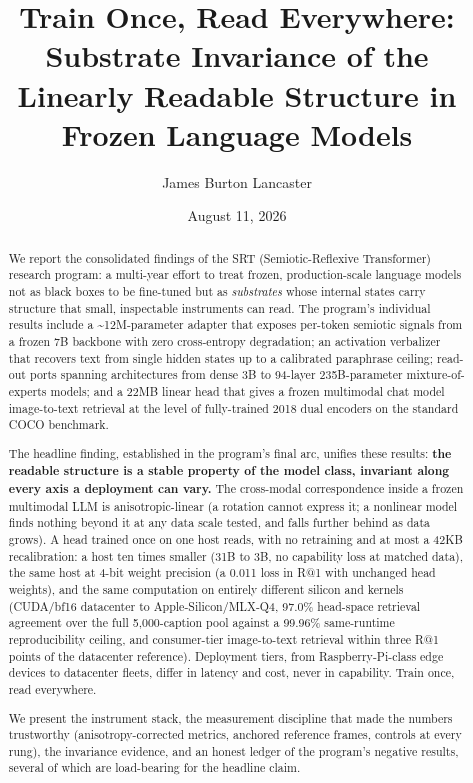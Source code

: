 \documentclass[
  11pt,
]{article}
\title{Train Once, Read Everywhere: Substrate Invariance of the Linearly
Readable Structure in Frozen Language Models}
\author{James Burton Lancaster}
\date{August 11, 2026}
\begin{document}
\maketitle
\begin{abstract}
We report the consolidated findings of the SRT (Semiotic-Reflexive
Transformer) research program: a multi-year effort to treat frozen,
production-scale language models not as black boxes to be fine-tuned but
as \emph{substrates} whose internal states carry structure that small,
inspectable instruments can read. The program's individual results
include a \textasciitilde12M-parameter adapter that exposes per-token
semiotic signals from a frozen 7B backbone with zero cross-entropy
degradation; an activation verbalizer that recovers text from single
hidden states up to a calibrated paraphrase ceiling; read-out ports
spanning architectures from dense 3B to 94-layer 235B-parameter
mixture-of-experts models; and a 22MB linear head that gives a frozen
multimodal chat model image-to-text retrieval at the level of
fully-trained 2018 dual encoders on the standard COCO benchmark.

The headline finding, established in the program's final arc, unifies
these results: \textbf{the readable structure is a stable property of
the model class, invariant along every axis a deployment can vary.} The
cross-modal correspondence inside a frozen multimodal LLM is
anisotropic-linear (a rotation cannot express it; a nonlinear model
finds nothing beyond it at any data scale tested, and falls further
behind as data grows). A head trained once on one host reads, with no
retraining and at most a 42KB recalibration: a host ten times smaller
(31B to 3B, no capability loss at matched data), the same host at 4-bit
weight precision (a 0.011 loss in R@1 with unchanged head weights), and
the same computation on entirely different silicon and kernels
(CUDA/bf16 datacenter to Apple-Silicon/MLX-Q4, 97.0\% head-space
retrieval agreement over the full 5,000-caption pool against a 99.96\%
same-runtime reproducibility ceiling, and consumer-tier image-to-text
retrieval within three R@1 points of the datacenter reference).
Deployment tiers, from Raspberry-Pi-class edge devices to datacenter
fleets, differ in latency and cost, never in capability. Train once,
read everywhere.

We present the instrument stack, the measurement discipline that made
the numbers trustworthy (anisotropy-corrected metrics, anchored
reference frames, controls at every rung), the invariance evidence, and
an honest ledger of the program's negative results, several of which are
load-bearing for the headline claim.
\end{abstract}
\end{document}
